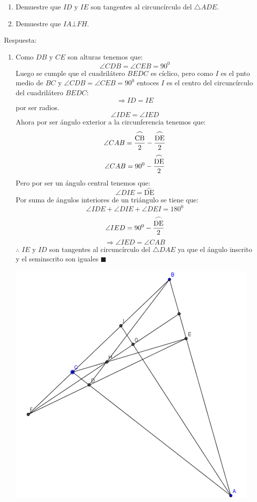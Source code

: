 \documentclass{book}
\begin{document}
\begin{enumerate}
 					\begin{enumerate}
 						\item Demuestre que $ID$ y $IE$ son tangentes al circuncírculo del $\triangle ADE$. 
 						\item Demuestre que $IA \bot FH$.
 					\end{enumerate}
 					Respuesta:
 					\begin{enumerate}
 					\item Como $DB$ y $CE$ son alturas tenemos que:
 					$$\angle CDB=\angle CEB=90^0$$
Luego se cumple que el cuadrilátero $BEDC$ es cíclico, pero como $I$ es el pnto medio de $BC$ y $\angle CDB=\angle CEB=90^0$ entoces $I$ es el centro del circuncírculo del cuadrilátero $BEDC$:
$$\Rightarrow ID=IE$$
por ser radios.
$$\angle IDE=\angle IED$$
Ahora por ser ángulo exterior a la circunferencia tenemos que:
$$\angle CAB={\stackrel{\textstyle\frown}{\mathrm{CB}}\over 2}-{\stackrel{\textstyle\frown}{\mathrm{DE}}\over 2}$$
$$\angle CAB=90^0-{\stackrel{\textstyle\frown}{\mathrm{DE}}\over 2}$$
Pero por ser un ángulo central tenemos que:
$$\angle DIE=\stackrel{\textstyle\frown}{\mathrm{DE}}$$
Por suma de ángulos interiores de un triángulo se tiene que:
$$\angle IDE+\angle DIE+\angle DEI=180^0$$
$$\angle IED=90^0-{\stackrel{\textstyle\frown}{\mathrm{DE}}\over 2}$$
$$\Rightarrow\angle IED=\angle CAB$$
$\therefore$ $IE$ y $ID$ son tangentes al circuncírculo del $\triangle DAE$ ya que el ángulo inscrito y el seminscrito son iguales $\blacksquare$
					\begin{center}
						\includegraphics[scale=1]{imagenes/Geometria/23.png}

\end{center}
\end{enumerate}
\end{enumerate}
\end{document}
